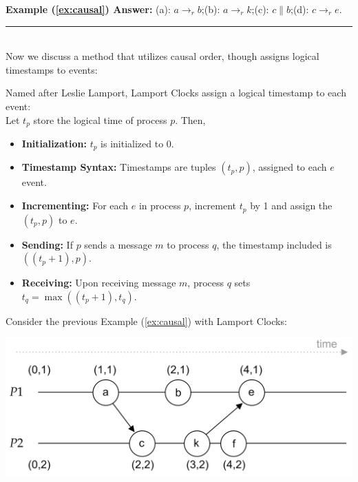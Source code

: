 \noindent
\textbf{Example (\ref{ex:causal}) Answer:} (a): $a \rightarrow_r b$;\quad (b): $a \rightarrow_r k$;\quad (c): $c \parallel b$;\quad (d): $c \rightarrow_r e$.\\
\noindent
\rule{\textwidth}{0.4pt}\\

\noindent
Now we discuss a method that utilizes causal order, though assigns logical timestamps to events:
\begin{Def}

    Named after Leslie Lamport, Lamport Clocks assign a logical timestamp to each event:\\
    
    \noindent
    Let $t_p$ store the logical time of process $p$. Then,
    \begin{itemize}
        \item \textbf{Initialization:} $t_p$ is initialized to 0.
        \item \textbf{Timestamp Syntax:} Timestamps are tuples $(t_p, p)$, assigned to each $e$ event.
        \item \textbf{Incrementing:} For each $e$ in process $p$, increment $t_p$ by 1 and assign the $(t_p, p)$ to $e$.
        \item \textbf{Sending:} If $p$ sends a message $m$ to process $q$, the timestamp included is $((t_p+1), p)$.
        \item \textbf{Receiving:} Upon receiving message $m$, process $q$ sets $t_q = \max((t_p+1),t_q)$.
    \end{itemize}
\end{Def}

\begin{Example}

    Consider the previous Example (\ref{ex:causal}) with Lamport Clocks:

    \hspace{4em}
    \includegraphics[width=.7\textwidth]{./Sections/time/lamport.png}

\end{Example}


